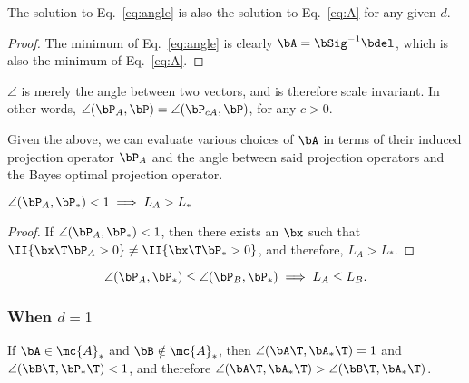 \documentclass[10pt]{article}
\begin{document}
\begin{lem} \label{l:angle}
The solution to Eq.~\eqref{eq:angle} is also the solution to Eq.~\eqref{eq:A} for any given $d$.
\end{lem}

\begin{proof}
The minimum of Eq.~\eqref{eq:angle} is clearly $\bA=\bSig^{-1} \bdel$, which is also the minimum of Eq.~\eqref{eq:A}.
\end{proof}


\begin{remark} 
$\angle$ is merely the angle between two vectors, and is therefore scale invariant.  In other words, $\angle(\bP_A,\bP)=\angle(\bP_{c A},\bP)$, for any $c > 0$.
\end{remark}

Given the above, we can evaluate various choices of $\bA$ in terms of their induced projection operator $\bP_A$ and the angle between said projection operators and the Bayes optimal projection operator.  


\begin{lem}
$\angle(\bP_A, \bP_*) <1  \implies L_A > L_*$
\end{lem}


\begin{proof}
If $\angle(\bP_A, \bP_*) <1$, then there exists an $\bx$ such that $\II\{ \bx\T \bP_A >0 \} \neq \II\{ \bx\T \bP_* >0 \}$, and therefore, $L_A > L_*$.
\end{proof}



\begin{conj}
\label{q:a2}
$$\angle(\bP_A,\bP_*) \leq \angle(\bP_B,\bP_*) \implies L_A \leq L_B.$$
\end{conj}







\subsubsection{When $d=1$}

\begin{remark}
If $\bA \in \mc{A}_*$ and $\bB \notin \mc{A}_*$, then $\angle(\bA\T,\bA_*\T)=1$ and $\angle(\bB\T,\bP_*\T)<1$, and therefore $\angle(\bA\T,\bA_*\T) > \angle(\bB\T,\bA_*\T)$.
\end{remark}
\end{document}
